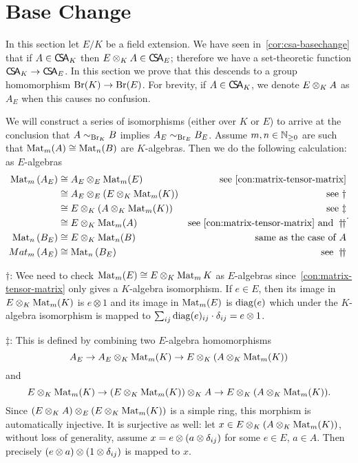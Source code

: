 \section{Base Change}
In this section let $E/K$ be a field extension. We have seen in~\cref{cor:csa-basechange} that if $A\in\operatorname{\mathsf{C}\!\mathsf{S}\!\mathsf{A}}_{K}$ then $E\otimes_{K}A\in\operatorname{\mathsf{C}\!\mathsf{S}\!\mathsf{A}}_{E}$; therefore we have a set-theoretic function $\operatorname{\mathsf{C}\!\mathsf{S}\!\mathsf{A}}_{K}\to\operatorname{\mathsf{C}\!\mathsf{S}\!\mathsf{A}}_{E}$. In this section we prove that this descends to a group homomorphism $\operatorname{Br}(K)\to\operatorname{Br}(E)$. For brevity, if $A\in \operatorname{\mathsf{C}\!\mathsf{S}\!\mathsf{A}}_{K}$, we denote $E\otimes_{K}A$ as $A_{E}$ when this causes no confusion.
\begin{construction}
  \label{con:br-base-change}
  We will construct a series of isomorphisms (either over $K$ or $E$) to arrive at the conclusion that $A\sim_{\operatorname{Br}_{K}}B$ implies $A_{E}\sim_{\operatorname{Br}_{E}}B_{E}$. Assume $m,n\in\mathbb{N}_{\ge0}$ are such that $\operatorname{Mat}_{m}(A)\cong\operatorname{Mat}_{n}(B)$ are $K$-algebras. Then we do the following calculation: as $E$-algebras
  \[
    \begin{aligned}
      \Mat_{m}\left(A_{E}\right)
      &\cong A_{E}\otimes_{E}\Mat_{m}(E) &\text{see~\cref{con:matrix-tensor-matrix}}\\
      &\cong A_{E}\otimes_{E}\left(E\ox_{K} \Mat_{m}(K)\right) & \text{see}~\dagger\\
      &\cong E \ox_{K}\left(A\ox_{K}\Mat_{m}(K)\right) &\text{see}~\ddagger\\
      &\cong E\ox_{K}\Mat_{m}(A) &\text{see~\cref{con:matrix-tensor-matrix} and}~\dagger\!\!\dagger \\
      \Mat_{n}\left(B_{E}\right) &\cong E\ox_{K}\Mat_{n}(B) &\text{same as the case of}~A\\
      Mat_{m}\left(A_{E}\right)&\cong \Mat_{n}\left(B_{E}\right) &\text{see}~\dagger\!\!\dagger
    \end{aligned}.
  \]

   \noindent$\dagger$: Wee need to check $\operatorname{Mat}_{m}(E)\cong E\otimes_{K}\operatorname{Mat}_{m}K$ as $E$-algebras since~\cref{con:matrix-tensor-matrix} only gives a $K$-algebra isomorphism. If $e \in E$, then its image in $E\otimes_{K}\operatorname{Mat}_{m}(K)$ is $e\otimes 1$ and its image in $\operatorname{Mat}_{m}(E)$ is $\operatorname{diag}(e)$ which under the $K$-algebra isomorphism is mapped to $\sum_{ij}\operatorname{diag}(e)_{ij}\cdot \delta_{ij}=e\otimes1$.

   \noindent$\ddagger$: This is defined by combining two $E$-algebra homomorphisms
   \[
     A_{E}\to A_{E}\otimes_{K}\operatorname{Mat}_{m}(K)\to E\otimes_{K}\left(A\otimes_{K}\operatorname{Mat}_{m}(K)\right)\]
     and
     \[
       E\otimes_{K}\operatorname{Mat}_{m}(K)\to \left(E\otimes_{K}\operatorname{Mat}_{m}(K)\right)\otimes_{K}A \to E\otimes_{K}(A\otimes_{K}\operatorname{Mat}_{m}(K)).
    \]
   Since $\left(E\otimes_{K}A\right)\otimes_{E}\left(E\otimes_{K}\operatorname{Mat}_{m}(K)\right)$ is a simple ring, this morphism is automatically injective. It is surjective as well: let $x\in E\otimes_{K}\left(A\otimes_{K}\operatorname{Mat}_{m}(K)\right)$, without loss of generality, assume $x=e\otimes (a\otimes\delta_{ij})$ for some $e\in E$, $a\in A$. Then precisely $\left(e\otimes a\right)\otimes\left(1\otimes\delta_{ij}\right)$ is mapped to $x$.


\end{construction}
